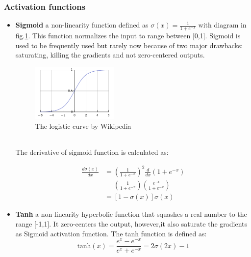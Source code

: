 \subsubsection{Activation functions}
\begin{itemize}
    \item \textbf{Sigmoid} a non-linearity function defined as $\sigma(x)=\frac{1}{1 + e^{-x}}$ with diagram in fig.\ref{fig:sigmoid}. This function normalizes the input to range between [0,1]. Sigmoid is used to be frequently used but rarely now because of two major drawbacks: saturating, killing the gradients and not zero-centered outputs.\\
    \begin{figure}[h!]
        \centering
        \includegraphics[width=0.4\textwidth]{Chapters/Fig/sigmoid.png}
        \caption{The logistic curve by Wikipedia}
        \label{fig:sigmoid}
    \end{figure}\\
    The derivative of sigmoid function is calculated as:
    \begin{center}
        \begin{equation}
            \begin{split}
                \frac{d\sigma(x)}{dx} & = (\frac{1}{1+e^{-x}})^2\frac{d}{dx}(1+e^{-x})\\
                                    & = (\frac{1}{1+e^{-x}})(\frac{e^{-x}}{1+e^{-x}})\\
                                    & = [1-\sigma(x)]\sigma(x)
            \end{split}
        \end{equation}
    \end{center}
    \pagebreak
    \item \textbf{Tanh} a non-linearity hyperbolic function that squashes a real number to the range [-1,1]. It zero-centers the output, however,it also saturate the gradients as Sigmoid activation function. The tanh function is defined as:
    \begin{equation}
        \text{tanh}(x) = \frac{e^x - e^{-x}}{e^x + e^{-x}} = 2\sigma(2x) - 1
    \end{equation}

\end{itemize}
